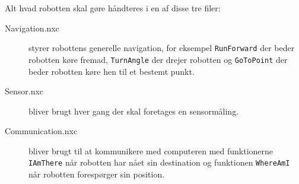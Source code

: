 Alt hvad robotten skal gøre håndteres i en af disse tre filer:

\begin{description}
\item[Navigation.nxc]{styrer robottens generelle navigation, for eksempel \lstinline[style=c]!RunForward! der beder robotten køre fremad, \lstinline[style=c]!TurnAngle! der drejer robotten og \lstinline[style=c]!GoToPoint! der beder robotten køre hen til et bestemt punkt.}
\item[Sensor.nxc]{bliver brugt hver gang der skal foretages en sensormåling.}
\item[Communication.nxc]{bliver brugt til at kommunikere med computeren med funktionerne \lstinline[style=c]!IAmThere! når robotten har nået sin destination og funktionen \lstinline[style=c]!WhereAmI! når robotten forespørger sin position.}
\end{description}
